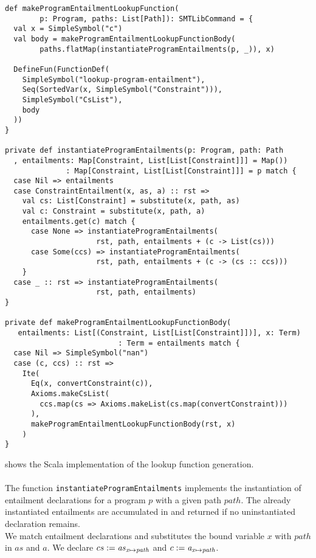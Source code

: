 \begin{lstlisting}[caption={Lookup Function Generation},label=lst:lookup,captionpos=b,frame={lines}]
def makeProgramEntailmentLookupFunction(
        p: Program, paths: List[Path]): SMTLibCommand = {
  val x = SimpleSymbol("c")
  val body = makeProgramEntailmentLookupFunctionBody(
        paths.flatMap(instantiateProgramEntailments(p, _)), x)

  DefineFun(FunctionDef(
    SimpleSymbol("lookup-program-entailment"),
    Seq(SortedVar(x, SimpleSymbol("Constraint"))),
    SimpleSymbol("CsList"),
    body
  ))
}

private def instantiateProgramEntailments(p: Program, path: Path
  , entailments: Map[Constraint, List[List[Constraint]]] = Map())
              : Map[Constraint, List[List[Constraint]]] = p match {
  case Nil => entailments
  case ConstraintEntailment(x, as, a) :: rst =>
    val cs: List[Constraint] = substitute(x, path, as)
    val c: Constraint = substitute(x, path, a)
    entailments.get(c) match {
      case None => instantiateProgramEntailments(
                     rst, path, entailments + (c -> List(cs)))
      case Some(ccs) => instantiateProgramEntailments(
                     rst, path, entailments + (c -> (cs :: ccs)))
    }
  case _ :: rst => instantiateProgramEntailments(
                     rst, path, entailments)
}

private def makeProgramEntailmentLookupFunctionBody(
   entailments: List[(Constraint, List[List[Constraint]])], x: Term)
                          : Term = entailments match {
  case Nil => SimpleSymbol("nan")
  case (c, ccs) :: rst =>
    Ite(
      Eq(x, convertConstraint(c)),
      Axioms.makeCsList(
        ccs.map(cs => Axioms.makeList(cs.map(convertConstraint)))
      ),
      makeProgramEntailmentLookupFunctionBody(rst, x)
    )
}
\end{lstlisting}
%
 shows the Scala implementation
of the lookup function generation.\\
\\
The function \lstinline{instantiateProgramEntailments}
implements the instantiation of entailment declarations
for a program $p$ with a given path $path$.
The already instantiated entailments are accumulated
in 
and returned if no uninstantiated declaration remains.\\
%
We match entailment declarations 
and substitutes the bound variable $x$ with $path$ in $as$ and $a$.
We declare $cs := \mathit{as}_{\mathit{x} \mapsto \mathit{path}}$ and $c := \mathit{a}_{\mathit{x} \mapsto \mathit{path}}$.
